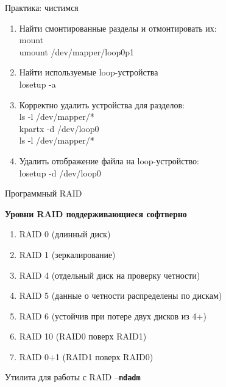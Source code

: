 \begin{frame}{Практика: чистимся}
	\begin{enumerate}
		\item Найти смонтированные разделы и отмонтировать их: \\
			mount \\
			umount /dev/mapper/loop0p1
			\pause
		\item Найти используемые loop-устройства\\
			losetup -a \\
			\pause
		\item Корректно удалить устройства для разделов:\\
			ls -l /dev/mapper/* \\
			kpartx -d /dev/loop0 \\
			ls -l /dev/mapper/* \\
			\pause
		\item Удалить отображение файла на loop-устройство: \\
			losetup -d /dev/loop0
	\end{enumerate}
\end{frame}


\begin{frame}{Программный RAID}
  \begin{center}
    \textbf{Уровни RAID поддерживающиеся софтверно}
   \end{center}
   \begin{enumerate}
     \item RAID 0 (длинный диск)
     \pause
     \item RAID 1 (зеркалирование)
     \pause 
     \item RAID 4 (отдельный диск на проверку четности)
     \pause
     \item RAID 5 (данные о четности распределены по дискам)
     \pause
     \item RAID 6 (устойчив при потере двух дисков из 4+)
     \pause
     \item RAID 10 (RAID0 поверх RAID1)
     \pause
     \item RAID 0+1 (RAID1 поверх RAID0)
   \end{enumerate}
   \pause
   Утилита для работы с RAID --\textbf{\tt mdadm}
\end{frame}

